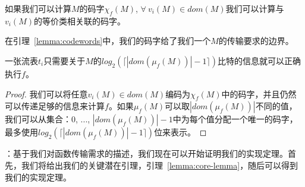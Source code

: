 \begin{definition} 如果我们可以计算$M$的码字$\chi_f(M)$, $\forall\ v_i(M) \in dom(M)$我们可以计算与$v_i(M)$的等价类相关联的码字。
\end{definition}

在引理~\ref{lemma:codewords}中，我们的码字给了我们一个$M$的传输要求的边界。

\begin{lemma} 
\label{lemma:codewords}
一张流表$t_i$只需要关于$M$的$log_2(\lceil |dom(\mu_f(M))|-1 \rceil)$比特的信息就可以正确执行$f$。
\end{lemma}

\begin{proof}
我们可以将任意$v_i(M) \in dom(M)$编码为$\chi_f(M)$中的码字，并且仍然可以传递足够的信息来计算$f$。如果$\mu_f(M)$可以取$|dom(\mu_f(M))|$不同的值，我们可以从集合：$0$, $...$, $|dom(\mu_f(M))|-1$中为每个值分配一个唯一的码字，最多使用$log_2(\lceil |dom(\mu_f(M))|-1 \rceil)$位来表示。
\end{proof}

：基于我们对函数传输需求的描述，我们现在可以开始证明我们的实现定理。首先，我们将给出我们的关键潜在引理，引理~\ref{lemma:core-lemma}，随后可以得到我们的实现定理。

